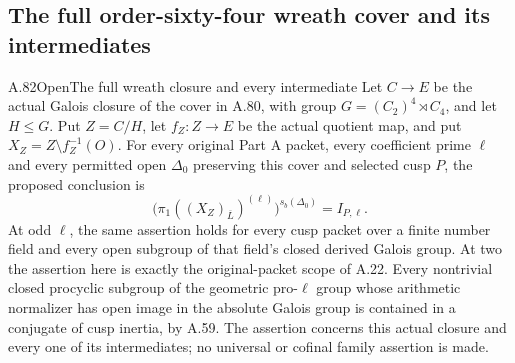 \subsection{The full order-sixty-four wreath cover and its intermediates}

\begin{statement}{A.82}{Open}{The full wreath closure and every intermediate}
Let \(C\to E\) be the actual Galois closure of the cover in A.80,
with group \(G=(C_2)^4\rtimes C_4\), and let \(H\le G\).
Put \(Z=C/H\), let \(f_Z:Z\to E\) be the actual quotient map,
and put \(X_Z=Z\setminus f_Z^{-1}(O)\).
For every original Part A packet, every coefficient prime \(\ell\)
and every permitted open \(\Delta_0\) preserving this cover and
selected cusp \(P\), the proposed conclusion is
\[
 \bigl(\pi_1((X_Z)_{\overline L})^{(\ell)}\bigr)^{s_b(\Delta_0)}
                           =I_{P,\ell}.                 \tag{A.82.1}
\]
At odd \(\ell\), the same assertion holds for every cusp packet
over a finite number field and every open subgroup of that field's
closed derived Galois group. At two the assertion here is exactly
the original-packet scope of A.22. Every nontrivial closed procyclic
subgroup of the geometric pro-\(\ell\) group whose arithmetic
normalizer has open image in the absolute Galois group is contained
in a conjugate of cusp inertia, by A.59.
The assertion concerns this actual closure and every one of its
intermediates; no universal or cofinal family assertion is made.
\end{statement}

